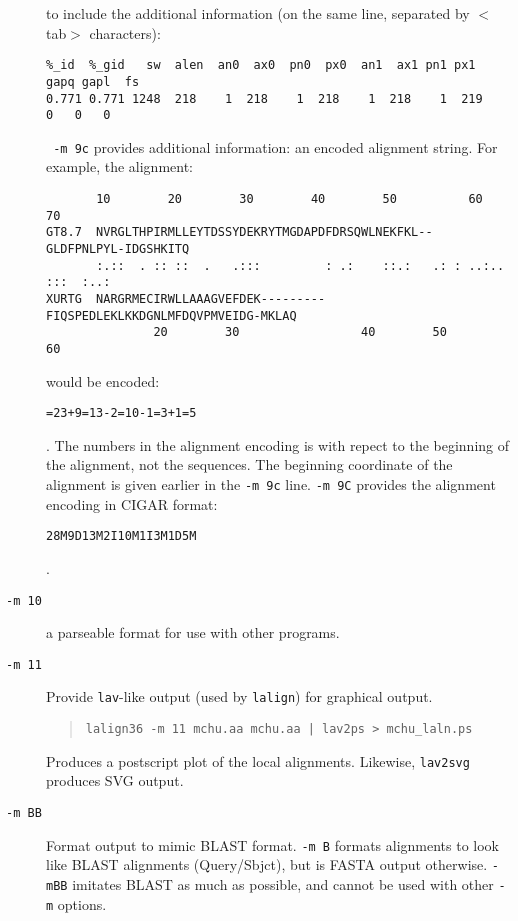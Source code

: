 \documentclass[11pt]{article}
\begin{document}
\begin{description}
to include the additional information (on the same line, separated by
$<$tab$>$ characters):
\begin{footnotesize}
\begin{verbatim}
%_id  %_gid   sw  alen  an0  ax0  pn0  px0  an1  ax1 pn1 px1 gapq gapl  fs
0.771 0.771 1248  218    1  218    1  218    1  218    1  219   0   0   0
\end{verbatim}
\end{footnotesize}
\texttt{ -m 9c} provides additional information: an encoded alignment string.  For example, the alignment:
\begin{footnotesize}
\begin{verbatim}
       10        20        30        40        50          60         70  
GT8.7  NVRGLTHPIRMLLEYTDSSYDEKRYTMGDAPDFDRSQWLNEKFKL--GLDFPNLPYL-IDGSHKITQ
       :.::  . :: ::  .   .:::         : .:    ::.:   .: : ..:.. :::  :..:
XURTG  NARGRMECIRWLLAAAGVEFDEK---------FIQSPEDLEKLKKDGNLMFDQVPMVEIDG-MKLAQ
               20        30                 40        50        60        
\end{verbatim}
\end{footnotesize}
would be encoded:
\begin{footnotesize}
\texttt{=23+9=13-2=10-1=3+1=5}
\end{footnotesize}.
The numbers in the alignment encoding is with repect to the beginning
of the alignment, not the sequences.  The beginning coordinate of the
alignment is given earlier in the \texttt{-m 9c} line.  \texttt{-m 9C}
provides the alignment encoding in CIGAR format:
\begin{footnotesize}
\texttt{28M9D13M2I10M1I3M1D5M}
\end{footnotesize}.
\item[\texttt{-m 10}]
a parseable format for use with other programs.
\item[\texttt{-m 11}]
Provide \texttt{lav}-like output (used by \texttt{lalign}) for graphical output.
\begin{quote}
\texttt{lalign36 -m 11 mchu.aa mchu.aa | lav2ps > mchu\_laln.ps}
\end{quote}
Produces a postscript plot of the local alignments.  Likewise,
\texttt{lav2svg} produces SVG output.

\item[\texttt{-m BB}] Format output to mimic BLAST format.  \texttt{-m
  B} formats alignments to look like BLAST alignments (Query/Sbjct),
  but is FASTA output otherwise. \texttt{-mBB} imitates BLAST as much
  as possible, and cannot be used with other \texttt{-m} options.


\end{description}
\end{document}
